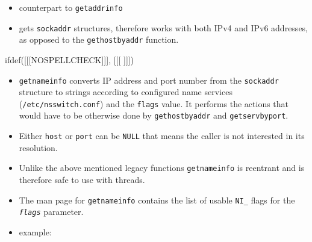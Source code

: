 \begin{slide}

\begin{itemize}
\item counterpart to \texttt{getaddrinfo}
\item gets \texttt{sockaddr} structures, therefore works with both
IPv4 and IPv6 addresses, as opposed to the \texttt{gethostbyaddr} function.
\end{itemize}
ifdef([[[NOSPELLCHECK]]], [[[
]]])
\end{slide}

\begin{itemize}
\item \texttt{getnameinfo} converts IP address and port number from the
\texttt{sockaddr} structure to strings according to configured name services
(\texttt{/etc/nsswitch.conf}) and the \texttt{flags} value.
It performs the actions that would have to be otherwise done by
\texttt{gethostbyaddr} and \texttt{getservbyport}.
\item Either \texttt{host} or \texttt{port} can be \texttt{NULL} that
means the caller is not interested in its resolution.
\item Unlike the above mentioned legacy functions \texttt{getnameinfo} is
reentrant and is therefore safe to use with threads.
\item The man page for \texttt{getnameinfo} contains the list of usable
\texttt{NI\_} flags for the \texttt{\emph{flags}} parameter.
\item \label{GETNAMEINFO} example: 


\end{itemize}


\label{TCPSRVEXAMPLE}

